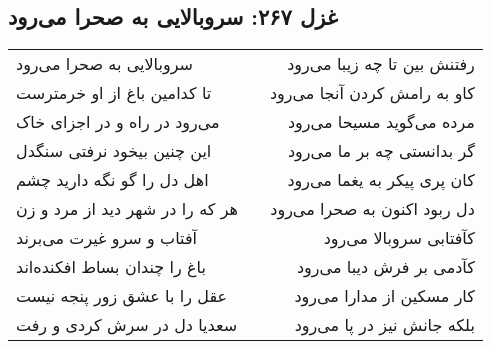 \begin{center}
\section*{غزل ۲۶۷: سروبالایی به صحرا می‌رود}
\label{sec:267}
\begin{longtable}{l p{0.5cm} r}
سروبالایی به صحرا می‌رود
&&
رفتنش بین تا چه زیبا می‌رود
\\
تا کدامین باغ از او خرمترست
&&
کاو به رامش کردن آنجا می‌رود
\\
می‌رود در راه و در اجزای خاک
&&
مرده می‌گوید مسیحا می‌رود
\\
این چنین بیخود نرفتی سنگدل
&&
گر بدانستی چه بر ما می‌رود
\\
اهل دل را گو نگه دارید چشم
&&
کان پری پیکر به یغما می‌رود
\\
هر که را در شهر دید از مرد و زن
&&
دل ربود اکنون به صحرا می‌رود
\\
آفتاب و سرو غیرت می‌برند
&&
کآفتابی سروبالا می‌رود
\\
باغ را چندان بساط افکنده‌اند
&&
کآدمی بر فرش دیبا می‌رود
\\
عقل را با عشق زور پنجه نیست
&&
کار مسکین از مدارا می‌رود
\\
سعدیا دل در سرش کردی و رفت
&&
بلکه جانش نیز در پا می‌رود
\\
\end{longtable}
\end{center}
